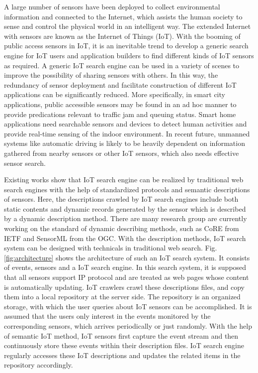 \documentclass[conference]{IEEEtran}
\begin{document}
A large number of sensors have been deployed to collect environmental information and connected to the Internet, which assists the human society to sense and control the physical world in an intelligent way. 
The extended Internet with sensors are known as the Internet of Things (IoT). 
With the booming of public access sensors in IoT, it is an inevitable trend to develop a generic search engine for IoT users and application builders to find different kinds of IoT sensors as required. 
A generic IoT search engine can be used in a variety of scenes to improve the possibility of sharing sensors with others.
In this way, the redundancy of sensor deployment and facilitate construction of different IoT applications can be significantly reduced.
More specifically, in smart city applications, public accessible sensors may be found in an ad hoc manner to provide predications relevant to traffic jam and queuing status. 
Smart home applications need searchable sensors and devices to detect human activities and provide real-time sensing of the indoor environment. 
In recent future, unmanned systems like automatic driving is likely to be heavily dependent on information gathered from nearby sensors or other IoT sensors, which also needs effective sensor search. 

Existing works show that IoT search engine can be realized by traditional web search engines with the help of standardized protocols and semantic descriptions of sensors\cite{Pfisterer2011}. 
Here, the descriptions crawled by IoT search engines include both static contents and dynamic records generated by the sensor which is described by a dynamic description method.
There are many research group are currently working on the standard of dynamic describing methods, such as CoRE\cite{CoREWorkingGroup2012} from IETF and SensorML\cite{botts2007opengis} from the OGC. 
With the description methods, IoT search system can be designed with technicals in traditional web search.
Fig.\ref{fig:architecture} shows the architecture of such an IoT search system.
It consists of events, sensors and a IoT search engine.
In this search system, it is supposed that all sensors support IP protocol and are treated as web pages whose content is automatically updating.
IoT crawlers crawl these descriptions files, and copy them into a local repository at the server side. 
The repository is an organized storage, with which the user queries about IoT sensors can be accomplished.
It is assumed that the users only interest in the events monitored by the corresponding sensors, which arrives periodically or just randomly. 
With the help of semantic IoT method, IoT sensors first capture the event stream and then continuously store these events within their description files. 
IoT search engine regularly accesses these IoT descriptions and updates the related items in the repository accordingly. 
\end{document}
